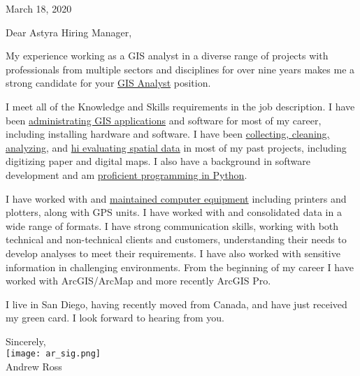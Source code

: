\documentclass[letterpaper]{article}
\newcommand{\impt}[1]{\underline{#1}}
\begin{document}
\large

\null\hfill March 18, 2020
\vspace{1em}

Dear Astyra Hiring Manager,

My experience working as a GIS analyst in a diverse range of projects with
professionals from multiple sectors and disciplines for over nine years makes me
a strong candidate for your \impt{GIS Analyst} position.


I meet all of the Knowledge and Skills requirements in the job description.  I
have been \impt{administrating GIS applications} and software for most of my
career, including installing hardware and software.  I have been
\impt{collecting, cleaning, analyzing}, and \underline{hi evaluating spatial data} in
most of my past projects, including digitizing paper and digital maps.  I also
have a background in software development and am \impt{proficient programming in
Python}.

I have worked with and \impt{maintained computer equipment} including printers and
plotters, along with GPS units.  I have worked with and consolidated data in a
wide range of formats.  I have strong communication skills, working with both
technical and non-technical clients and customers, understanding their needs to
develop analyses to meet their requirements.  I have also worked with sensitive
information in challenging environments.  From the beginning of my career I have
worked with ArcGIS/ArcMap and more recently ArcGIS Pro.


I live in San Diego, having recently moved from Canada, and have just received
my green card. I look forward to hearing from you.  


Sincerely,\\
\hspace{1em} \texttt{[image: ar\_sig.png]} \\
Andrew Ross
\end{document}
